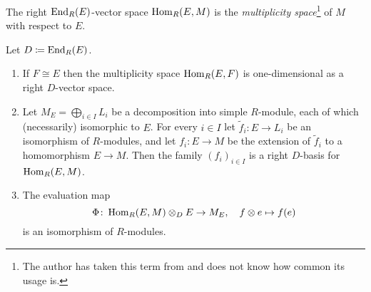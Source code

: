 \begin{definition}
  The right $\operatorname{End}_R(E)$-vector space $\operatorname{Hom}_R(E,M)$ is the \emph{multiplicity space}\footnote{
  The author has taken this term from \cite{AP2012DoubleCommutant} and does not know how common its usage is.
  } of $M$ with respect to $E$.
\end{definition}


\begin{proposition}
  \label{proposition: multiplicity spaces}
    Let $D \coloneqq \operatorname{End}_R(E)$.
    \begin{enumerate}
    \item
      \label{enumerate: one-dimensional as D vector space}
      If $F \cong E$ then the multiplicity space $\operatorname{Hom}_R(E,F)$ is one-dimensional as a right $D$-vector space.
    \item
      \label{enumerate: basis of multiplicity space}
      Let $M_E = \bigoplus_{i \in I} L_i$ be a decomposition into simple $R$-module, each of which (necessarily) isomorphic to $E$.
      For every $i \in I$ let $\tilde{f}_i \colon E \to L_i$ be an isomorphism of $R$-modules, and let $f_i \colon E \to M$ be the extension of $\tilde{f}_i$ to a homomorphism $E \to M$.
      Then the family $(f_i)_{i \in I}$ is a right $D$-basis for $\operatorname{Hom}_R(E,M)$.
    \item
      The evaluation map
      \[
                \Phi
        \colon  \operatorname{Hom}_R(E,M) \otimes_D E
        \to     M_E,
        \quad   f \otimes e
        \mapsto f(e)
      \]
      is an isomorphism of $R$-modules.
  \end{enumerate}
\end{proposition}


